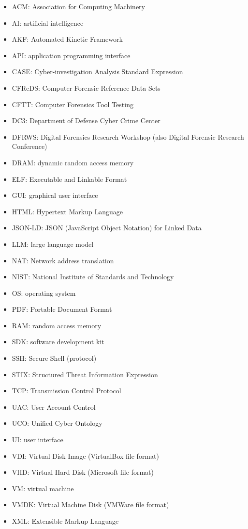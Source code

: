 \begin{itemize}
\item
  ACM: Association for Computing Machinery
\item
  AI: artificial intelligence
\item
  AKF: Automated Kinetic Framework
\item
  API: application programming interface
\item
  CASE: Cyber-investigation Analysis Standard Expression
\item
  CFReDS: Computer Forensic Reference Data Sets
\item
  CFTT: Computer Forensics Tool Testing
\item
  DC3: Department of Defense Cyber Crime Center
\item
  DFRWS: Digital Forensics Research Workshop (also Digital Forensic
  Research Conference)
\item
  DRAM: dynamic random access memory
\item
  ELF: Executable and Linkable Format
\item
  GUI: graphical user interface
\item
  HTML: Hypertext Markup Language
\item
  JSON-LD: JSON (JavaScript Object Notation) for Linked Data
\item
  LLM: large language model
\item
  NAT: Network address translation
\item
  NIST: National Institute of Standards and Technology
\item
  OS: operating system
\item
  PDF: Portable Document Format
\item
  RAM: random access memory
\item
  SDK: software development kit
\item
  SSH: Secure Shell (protocol)
\item
  STIX: Structured Threat Information Expression
\item
  TCP: Transmission Control Protocol
\item
  UAC: User Account Control
\item
  UCO: Unified Cyber Ontology
\item
  UI: user interface
\item
  VDI: Virtual Disk Image (VirtualBox file format)
\item
  VHD: Virtual Hard Disk (Microsoft file format)
\item
  VM: virtual machine
\item
  VMDK: Virtual Machine Disk (VMWare file format)
\item
  XML: Extensible Markup Language
\end{itemize}
